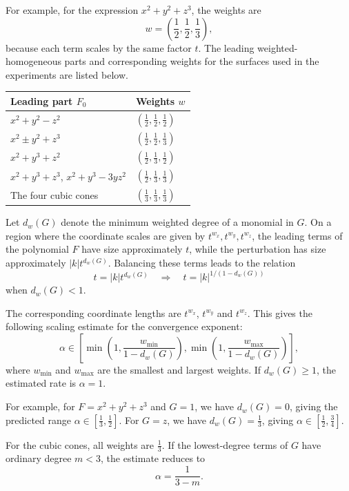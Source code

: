 \documentclass[12pt, a4paper]{article}
\theoremstyle{plain}
\theoremstyle{definition}
\theoremstyle{remark}
\theoremstyle{definition}
\begin{document}
For example, for the expression $x^2+y^2+z^3$, the weights are
\[
w=\left(\frac12,\frac12,\frac13\right),
\]
because each term scales by the same factor $t$.
The leading weighted-homogeneous parts and corresponding weights for the surfaces used in the experiments are listed below.

\begin{center}
\small
\begin{tabular}{l l}
\toprule
Leading part $F_0$ & Weights $w$ \\
\midrule
$x^2+y^2-z^2$ & $(\frac12,\frac12,\frac12)$ \\
$x^2\pm y^2+z^3$ & $(\frac12,\frac12,\frac13)$ \\
$x^2+y^3+z^2$ & $(\frac12,\frac13,\frac12)$ \\
$x^2+y^3+z^3$, $x^2+y^3-3yz^2$
    & $(\frac12,\frac13,\frac13)$ \\
The four cubic cones & $(\frac13,\frac13,\frac13)$ \\
\bottomrule
\end{tabular}
\end{center}

Let $d_w(G)$ denote the minimum weighted degree of a monomial in $G$.
On a region where the coordinate scales are given by $t^{w_x}, t^{w_y}, t^{w_z}$,
the leading terms of the polynomial $F$ have size approximately $t$, while
the perturbation has size approximately $|k|t^{d_w(G)}$.
Balancing these terms leads to the relation
\[
t=|k|t^{d_w(G)}
\quad\Longrightarrow\quad
t=|k|^{1/(1-d_w(G))}
\]
when $d_w(G)<1$.

The corresponding coordinate lengths are $t^{w_x}$, $t^{w_y}$
and $t^{w_z}$. This gives the following scaling estimate for the
convergence exponent:
\begin{equation}
\alpha\in
\left[
\min\left(1,\frac{w_{\min}}{1-d_w(G)}\right),
\min\left(1,\frac{w_{\max}}{1-d_w(G)}\right)
\right],
\label{eq:r-alpha}
\end{equation}
where $w_{\min}$ and $w_{\max}$ are the smallest and largest weights.
If $d_w(G)\geq1$, the estimated rate is $\alpha=1$.

For example, for $F=x^2+y^2+z^3$ and $G=1$, we have
$d_w(G)=0$, giving the predicted range
$\alpha\in[\frac13,\frac12]$. For $G=z$, we have
$d_w(G)=\frac13$, giving
$\alpha\in[\frac12,\frac34]$.

For the cubic cones, all weights are $\frac13$. If the lowest-degree
terms of $G$ have ordinary degree $m<3$, the estimate reduces to
\[
\alpha=\frac{1}{3-m}.
\]
\end{document}
